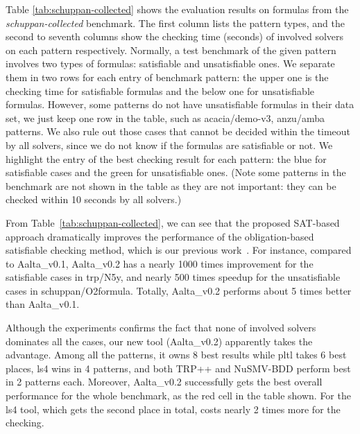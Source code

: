 \documentclass[conference]{IEEEtran}
\def\Aalta{{Aalta}}
\begin{document}
Table \ref{tab:schuppan-collected} shows the evaluation results on formulas from the 
\textit{schuppan-collected} benchmark.
The first column lists the pattern types, and the second to seventh columns show the checking time (seconds) of involved solvers on
each pattern respectively. 
Normally, a test benchmark of the given pattern involves two types of
formulas: satisfiable and unsatisfiable ones. We separate them in two
rows for each entry of benchmark pattern: the upper one is the
checking time for satisfiable formulas and the below one for
unsatisfiable formulas. However, some patterns do not have
unsatisfiable formulas in their data set, we just keep one row in the
table, such as \textsf{acacia/demo-v3}, \textsf{anzu/amba}
patterns. We also rule out those cases that cannot be decided within
the timeout by all solvers, since we do not know if the formulas are
satisfiable or not. We highlight the entry of the best checking result
for each pattern: the blue for satisfiable cases and the green for
unsatisfiable ones. (Note some patterns in the benchmark are not shown in the table as they are not 
important: they can be checked within 10 seconds by all solvers.)



From Table~\ref{tab:schuppan-collected}, we can see that the  proposed SAT-based approach dramatically improves the performance of the obligation-based satisfiable checking method, which is our previous work~\cite{LZPVH13}. For instance, compared to \Aalta\_v0.1, \Aalta\_v0.2 has a nearly 1000 times improvement
for the satisfiable cases in \textsf{trp/N5y}, and nearly 500 times speedup for the unsatisfiable cases in
\textsf{schuppan/O2formula}. Totally, \Aalta\_v0.2 performs about 5 times better than \Aalta\_v0.1.

Although the experiments confirms the fact
that none of involved solvers dominates all the cases, our new tool (\Aalta\_v0.2) apparently 
takes the advantage. Among all the patterns, it owns 8 best results while pltl takes 6 best 
places, ls4 wins in 4 patterns, and both TRP++ and NuSMV-BDD perform best in 2 patterns each. 
Moreover, \Aalta\_v0.2 successfully gets the best overall performance for the whole 
benchmark, as the red cell in the table shown. For the ls4 tool, which gets the second place 
in total, costs nearly 2 times more for the checking.  
\end{document}
